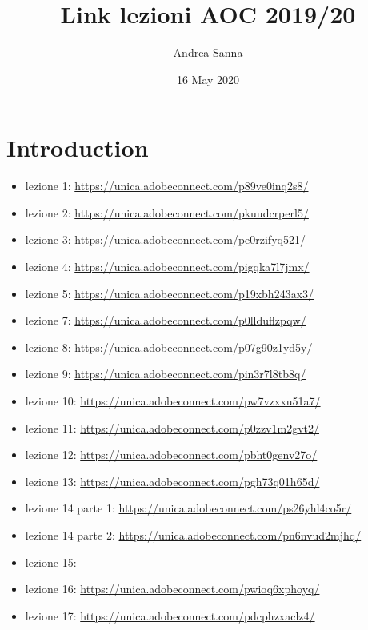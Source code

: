 \documentclass{article}
\title{Link lezioni AOC 2019/20}
\author{Andrea Sanna}
\date{16 May 2020}
\begin{document}
\maketitle

\section{Introduction}
\begin{itemize}
\item lezione 1: \url{https://unica.adobeconnect.com/p89ve0inq2s8/}\\
\item lezione 2: \url{https://unica.adobeconnect.com/pkuudcrperl5/}\\
\item lezione 3: \url{https://unica.adobeconnect.com/pe0rzifyq521/}\\
\item lezione 4: \url{https://unica.adobeconnect.com/pigqka7l7jmx/}\\
\item lezione 5: \url{https://unica.adobeconnect.com/p19xbh243ax3/}\\
\item lezione 7: \url{https://unica.adobeconnect.com/p0llduflzpqw/}\\
\item lezione 8: \url{https://unica.adobeconnect.com/p07g90z1yd5y/}\\
\item lezione 9: \url{https://unica.adobeconnect.com/pin3r7l8tb8q/}\\
\item lezione 10: \url{https://unica.adobeconnect.com/pw7vzxxu51a7/}\\
\item lezione 11: \url{https://unica.adobeconnect.com/p0zzv1m2gvt2/}\\
\item lezione 12: \url{https://unica.adobeconnect.com/pbht0genv27o/}\\
\item lezione 13: \url{https://unica.adobeconnect.com/pgh73q01h65d/}\\
\item lezione 14 parte 1: \url{https://unica.adobeconnect.com/ps26yhl4co5r/}\\
\item lezione 14 parte 2: \url{https://unica.adobeconnect.com/pn6nvud2mjhq/}\\
\item lezione 15: \url{}\\
\item lezione 16: \url{https://unica.adobeconnect.com/pwioq6xphoyq/}\\
\item lezione 17: \url{https://unica.adobeconnect.com/pdcphzxaclz4/}\\
\end{itemize}
\end{document}
